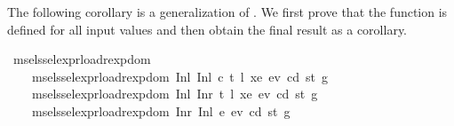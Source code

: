 \begin{isabellebody}
%
\isadelimdocument
%
\endisadelimdocument
%
\isatagdocument
%
\isamarkuptrue%
%
\endisatagdocument
{\isafolddocument}%
%
\isadelimdocument
%
\endisadelimdocument
%
\begin{isamarkuptext}%
The following corollary is a generalization of .
  We first prove that the function is defined for all input values and then obtain the final result as a corollary.%
\end{isamarkuptext}\isamarkuptrue%
\isamarkupfalse%
\ msel{\isacharunderscore}{\kern0pt}ssel{\isacharunderscore}{\kern0pt}expr{\isacharunderscore}{\kern0pt}load{\isacharunderscore}{\kern0pt}rexp{\isacharunderscore}{\kern0pt}dom{\isacharcolon}{\kern0pt}\isanewline
\ \ \ \ {\isachardoublequoteopen}msel{\isacharunderscore}{\kern0pt}ssel{\isacharunderscore}{\kern0pt}expr{\isacharunderscore}{\kern0pt}load{\isacharunderscore}{\kern0pt}rexp{\isacharunderscore}{\kern0pt}dom\ {\isacharparenleft}{\kern0pt}Inl\ {\isacharparenleft}{\kern0pt}Inl\ {\isacharparenleft}{\kern0pt}c{}{\isacharcomma}{\kern0pt}\ t{}{\isacharcomma}{\kern0pt}\ l{}{\isacharcomma}{\kern0pt}\ xe{}{\isacharcomma}{\kern0pt}\ ev{}{\isacharcomma}{\kern0pt}\ cd{}{\isacharcomma}{\kern0pt}\ st{}{\isacharcomma}{\kern0pt}\ g{}{\isacharparenright}{\kern0pt}{\isacharparenright}{\kern0pt}{\isacharparenright}{\kern0pt}{\isachardoublequoteclose}\isanewline
\ \ \ \ {\isachardoublequoteopen}msel{\isacharunderscore}{\kern0pt}ssel{\isacharunderscore}{\kern0pt}expr{\isacharunderscore}{\kern0pt}load{\isacharunderscore}{\kern0pt}rexp{\isacharunderscore}{\kern0pt}dom\ {\isacharparenleft}{\kern0pt}Inl\ {\isacharparenleft}{\kern0pt}Inr\ {\isacharparenleft}{\kern0pt}t{}{\isacharcomma}{\kern0pt}\ l{}{\isacharcomma}{\kern0pt}\ xe{}{\isacharcomma}{\kern0pt}\ ev{}{\isacharcomma}{\kern0pt}\ cd{}{\isacharcomma}{\kern0pt}\ st{}{\isacharcomma}{\kern0pt}\ g{}{\isacharparenright}{\kern0pt}{\isacharparenright}{\kern0pt}{\isacharparenright}{\kern0pt}{\isachardoublequoteclose}\isanewline
\ \ \ \ {\isachardoublequoteopen}msel{\isacharunderscore}{\kern0pt}ssel{\isacharunderscore}{\kern0pt}expr{\isacharunderscore}{\kern0pt}load{\isacharunderscore}{\kern0pt}rexp{\isacharunderscore}{\kern0pt}dom\ {\isacharparenleft}{\kern0pt}Inr\ {\isacharparenleft}{\kern0pt}Inl\ {\isacharparenleft}{\kern0pt}e{}{\isacharcomma}{\kern0pt}\ ev{}{\isacharcomma}{\kern0pt}\ cd{}{\isacharcomma}{\kern0pt}\ st{}{\isacharcomma}{\kern0pt}\ g{}{\isacharparenright}{\kern0pt}{\isacharparenright}{\kern0pt}{\isacharparenright}{\kern0pt}{\isachardoublequoteclose}\isanewline

\end{isabellebody}

